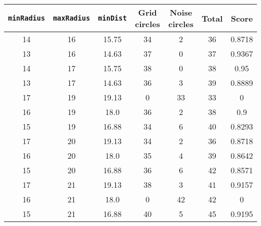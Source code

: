 \documentclass[letterpaper, 12pt]{article}
\begin{document}
\begin{longtable}{|c|c|c|c|c|c|c|}
\hline
\textbf{\texttt{minRadius}} & \textbf{\texttt{maxRadius}} & \textbf{\texttt{minDist}} & \textbf{Grid circles} & \textbf{Noise circles} & \textbf{Total} & \textbf{Score} \\
\hline
14 & 16 & 15.75 & 34 & 2 & 36 & 0.8718 \\
\hline
13 & 16 & 14.63 & 37 & 0 & 37 & 0.9367 \\
\hline
14 & 17 & 15.75 & 38 & 0 & 38 & 0.95 \\
\hline
13 & 17 & 14.63 & 36 & 3 & 39 & 0.8889 \\
\hline
17 & 19 & 19.13 & 0 & 33 & 33 & 0 \\
\hline
16 & 19 & 18.0 & 36 & 2 & 38 & 0.9 \\
\hline
15 & 19 & 16.88 & 34 & 6 & 40 & 0.8293 \\
\hline
17 & 20 & 19.13 & 34 & 2 & 36 & 0.8718 \\
\hline
16 & 20 & 18.0 & 35 & 4 & 39 & 0.8642 \\
\hline
15 & 20 & 16.88 & 36 & 6 & 42 & 0.8571 \\
\hline
17 & 21 & 19.13 & 38 & 3 & 41 & 0.9157 \\
\hline
16 & 21 & 18.0 & 0 & 42 & 42 & 0 \\
\hline
15 & 21 & 16.88 & 40 & 5 & 45 & 0.9195 \\
\hline
\end{longtable}
\end{document}
